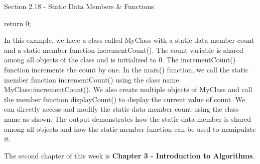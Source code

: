 \begin{notes}{Section 2.18 - Static Data Members \& Functions}
\begin{highlight}
\begin{code}[C++]
{        return 0;
    }
    \end{code}
        In this example, we have a class called MyClass with a static data member count and a static member function incrementCount(). The count variable is shared among all objects of the class and is initialized to 0. The incrementCount() function increments the count by one. In the main() function, we call the static member 
        function incrementCount() using the class name MyClass::incrementCount(). We also create multiple objects of MyClass and call the member function displayCount() to display the current value of count. We can directly access and modify the static data member count using the class name as shown. The output demonstrates how 
        the static data member is shared among all objects and how the static member function can be used to manipulate it.
    \end{highlight}
\end{notes}

The second chapter of this week is \textbf{Chapter 3 - Introduction to Algorithms}.

